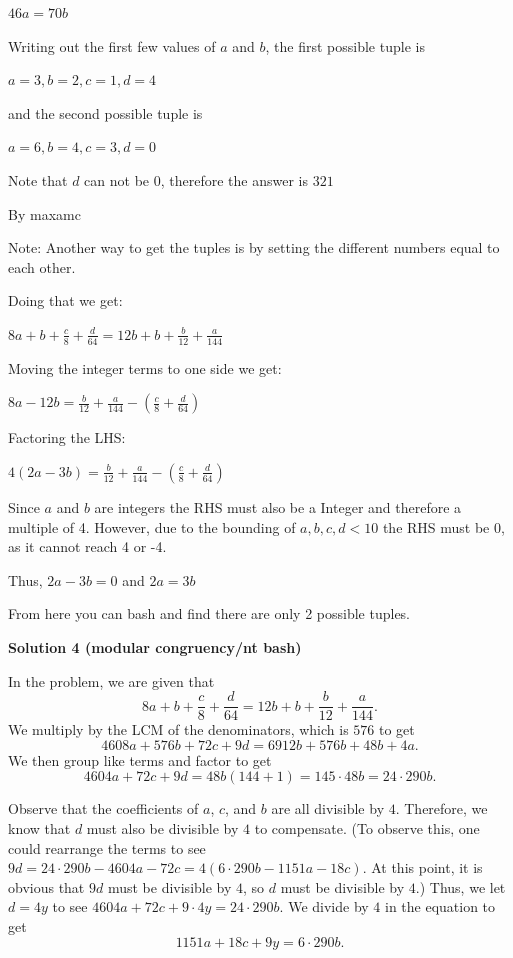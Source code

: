 \begin{enumerate}
 $46a=70b$

 Writing out the first few values of $a$ and $b$, the first possible tuple is 

 $a=3, b=2, c=1, d=4$ 

 and the second possible tuple is

 $a=6, b=4, c=3, d=0$

 Note that $d$ can not be $0$, therefore the answer is $\boxed{321}$

 By maxamc

 


 


 Note: Another way to get the tuples is by setting the different numbers equal to each other.

 Doing that we get:

 $8a + b + \frac{c}{8} + \frac{d}{64} = 12b + b + \frac{b}{12} + \frac{a}{144}$

 Moving the integer terms to one side we get:

 $8a - 12b = \frac{b}{12} + \frac{a}{144} - (\frac{c}{8} + \frac{d}{64})$

 Factoring the LHS:

 $4(2a - 3b) = \frac{b}{12} + \frac{a}{144} - (\frac{c}{8} + \frac{d}{64})$

 Since $a$ and $b$ are integers the RHS must also be a Integer and therefore a multiple of 4. However, due to the bounding of $a, b, c, d < 10$ the RHS must be 0, as it cannot reach 4 or -4.

 Thus, $2a - 3b = 0$ and $2a = 3b$

 From here you can bash and find there are only 2 possible tuples.

 



\textbf{Solution 4 (modular congruency/nt bash)}

In the problem, we are given that 
 \[8a+b+\dfrac c8+\dfrac d{64}=12b+b+\dfrac b{12}+\dfrac a{144}.\] We multiply by the LCM of the denominators, which is $576$ to get 
 \[4608a+576b+72c+9d=6912b+576b+48b+4a.\] We then group like terms and factor to get 
 \[4604a+72c+9d=48b(144+1)=145\cdot48b=24\cdot290b.\] 

 Observe that the coefficients of $a$, $c$, and $b$ are all divisible by $4$. Therefore, we know that $d$ must also be divisible by $4$ to compensate. (To observe this, one could rearrange the terms to see $9d=24\cdot290b-4604a-72c=4(6\cdot290b-1151a-18c)$. At this point, it is obvious that $9d$ must be divisible by $4$, so $d$ must be divisible by $4$.) Thus, we let $d=4y$ to see $4604a+72c+9\cdot4y=24\cdot290b$. We divide by $4$ in the equation to get 
 \[1151a+18c+9y=6\cdot290b.\] 


\end{enumerate}
